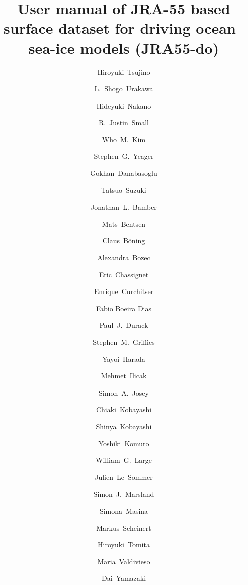 \documentclass[dvipdfmx]{elsarticle_mod}
\begin{document}

\begin{frontmatter}

\title{User manual of JRA-55 based surface dataset for driving ocean--sea-ice models (JRA55-do)}

\author[MRIaddress]{Hiroyuki~Tsujino}
\author[MRIaddress]{L.~Shogo~Urakawa}
\author[MRIaddress]{Hideyuki~Nakano}
\author[NCARaddress]{R.~Justin~Small}
\author[NCARaddress]{Who~M.~Kim}
\author[NCARaddress]{Stephen~G.~Yeager}
\author[NCARaddress]{Gokhan~Danabasoglu}
\author[JAMSTECaddress]{Tatsuo~Suzuki}
\author[UBristoladdress]{Jonathan~L.~Bamber}
\author[Bergenaddress]{Mats~Bentsen}
\author[Kieladdress]{Claus~B\"{o}ning}
\author[FSUaddress]{Alexandra~Bozec}
\author[FSUaddress]{Eric~Chassignet}
\author[Rutgersaddress]{Enrique~Curchitser}
\author[SIMONadd4,SIMONadd3,SIMONadd2,SIMONadd1]{Fabio Boeira Dias}
\author[LLNLaddress]{Paul~J.~Durack}
\author[GFDLaddress]{Stephen~M.~Griffies}
\author[MRIaddress]{Yayoi~Harada}
\author[Bergenaddress,Ilicakaddress]{Mehmet~Ilicak}
\author[NOCaddress]{Simon~A.~Josey}
\author[MRIaddress]{Chiaki~Kobayashi}
\author[JMAaddress]{Shinya~Kobayashi}
\author[JAMSTECaddress]{Yoshiki~Komuro}
\author[NCARaddress]{William~G.~Large}
\author[Grenobleaddress1,Grenobleaddress2]{Julien~Le~Sommer}
\author[SIMONadd1,SIMONadd2,SIMONadd3,SIMONadd4]{Simon~J.~Marsland}
\author[CMCCaddress1,CMCCaddress2]{Simona~Masina}
\author[Kieladdress]{Markus~Scheinert}
\author[NAGOYAaddress]{Hiroyuki~Tomita}
\author[READINGaddress]{Maria~Valdivieso}
\author[JAMSTECaddress,UTOKYOaddress]{Dai~Yamazaki}
 

\end{frontmatter}
\end{document}
